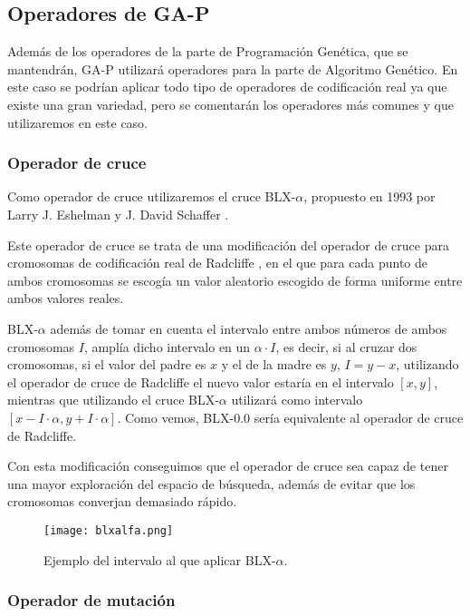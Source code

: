 \subsection{Operadores de GA-P}

Además de los operadores de la parte de Programación Genética, que se mantendrán, GA-P utilizará operadores para la parte de Algoritmo Genético. En este caso se podrían aplicar todo tipo de operadores de codificación real ya que existe una gran variedad, pero se comentarán los operadores más comunes y que utilizaremos en este caso.

\subsubsection{Operador de cruce}

Como operador de cruce utilizaremos el cruce BLX-$\alpha$, propuesto en 1993 por Larry J. Eshelman y J. David Schaffer \cite{cruceBLXalfa}.

Este operador de cruce se trata de una modificación del operador de cruce para cromosomas de codificación real de Radcliffe \cite{cruceRadcliffe}, en el que para cada punto de ambos cromosomas se escogía un valor aleatorio escogido de forma uniforme entre ambos valores reales.

BLX-$\alpha$ además de tomar en cuenta el intervalo entre ambos números de ambos cromosomas $I$, amplía dicho intervalo en un $\alpha \cdot I$, es decir, si al cruzar dos cromosomas, si el valor del padre es $x$ y el de la madre es $y$, $I = y - x$, utilizando el operador de cruce de Radcliffe el nuevo valor estaría en el intervalo $[x, y]$, mientras que utilizando el cruce BLX-$\alpha$ utilizará como intervalo $[x - I \cdot \alpha, y + I \cdot \alpha]$. Como vemos, BLX-$0.0$ sería equivalente al operador de cruce de Radcliffe.

Con esta modificación conseguimos que el operador de cruce sea capaz de tener una mayor exploración del espacio de búsqueda, además de evitar que los cromosomas converjan demasiado rápido.

\begin{figure}[H]
	 \centering
	 \texttt{[image: blxalfa.png]}
	 \caption{Ejemplo del intervalo al que aplicar BLX-$\alpha$.}
	\label{fig:cruceBLXa}
\end{figure}


\subsubsection{Operador de mutación}

